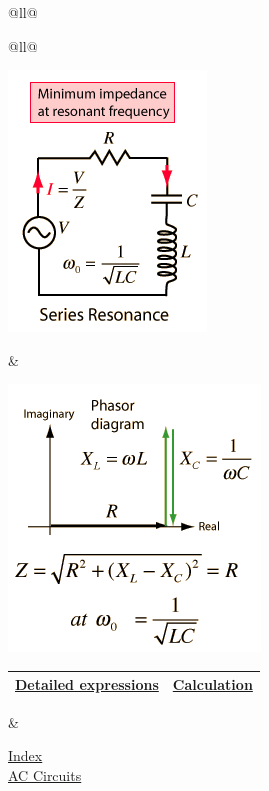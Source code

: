 \begin{longtable}[]{@{}ll@{}}
\begin{minipage}[t]{0.48\columnwidth}
\begin{longtable}[]{@{}ll@{}}
\toprule
\begin{minipage}[t]{0.48\columnwidth}\raggedright\strut
\includegraphics{./Resonant RLC Circuits_files/acres2.png}\strut
\end{minipage} & \begin{minipage}[t]{0.48\columnwidth}\raggedright\strut
\includegraphics{./Resonant RLC Circuits_files/acres3.png}

\begin{longtable}[]{@{}ll@{}}
\toprule
\href{http://hyperphysics.phy-astr.gsu.edu/hbase/electric/rlcser.html\#c1}{Detailed
expressions} &
\href{http://hyperphysics.phy-astr.gsu.edu/hbase/electric/rlcser.html\#c2}{Calculation}\tabularnewline
\bottomrule
\end{longtable}\strut
\end{minipage}\tabularnewline
\bottomrule
\end{longtable}\strut
\end{minipage} & \begin{minipage}[t]{0.48\columnwidth}\raggedright\strut
\href{http://hyperphysics.phy-astr.gsu.edu/hbase/hframe.html}{Index}\\[2\baselineskip]\href{http://hyperphysics.phy-astr.gsu.edu/hbase/electric/accircon.html\#c1}{AC
Circuits}\strut
\end{minipage}\tabularnewline
\begin{minipage}[t]{0.48\columnwidth}\raggedright\strut
~


\end{minipage}
\end{longtable}
